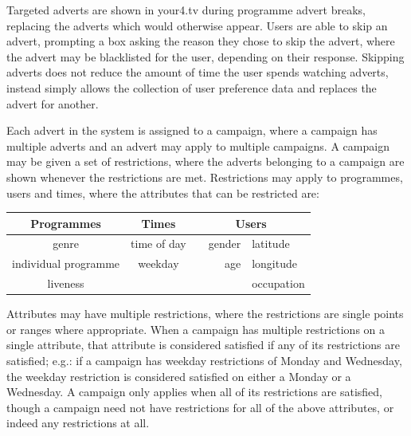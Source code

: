 Targeted adverts are shown in your4.tv during programme advert breaks, replacing the adverts which would otherwise appear. Users are able to skip an advert, prompting a box asking the reason they chose to skip the advert, where the advert may be blacklisted for the user, depending on their response. Skipping adverts does not reduce the amount of time the user spends watching adverts, instead simply allows the collection of user preference data and replaces the advert for another.

Each advert in the system is assigned to a campaign, where a campaign has multiple adverts and an advert may apply to multiple campaigns. A campaign may be given a set of restrictions, where the adverts belonging to a campaign are shown whenever the restrictions are met. Restrictions may apply to programmes, users and times, where the attributes that can be restricted are:

\begin{center}
	\begin{tabular}{c c r l}
		\toprule
		\textbf{Programmes} & \textbf{Times} & \multicolumn{2}{c}{\textbf{Users}} \\
		\midrule
		genre & time of day & ~~gender & latitude \\ %
		individual programme & weekday & age & longitude \\
		liveness & & &  occupation \\
		\bottomrule
	\end{tabular}
\end{center}

Attributes may have multiple restrictions, where the restrictions are single points or ranges where appropriate. When a campaign has multiple restrictions on a single attribute, that attribute is considered satisfied if any of its restrictions are satisfied; e.g.: if a campaign has weekday restrictions of Monday and Wednesday, the weekday restriction is considered satisfied on either a Monday or a Wednesday. A campaign only applies when all of its restrictions are satisfied, though a campaign need not have restrictions for all of the above attributes, or indeed any restrictions at all.


